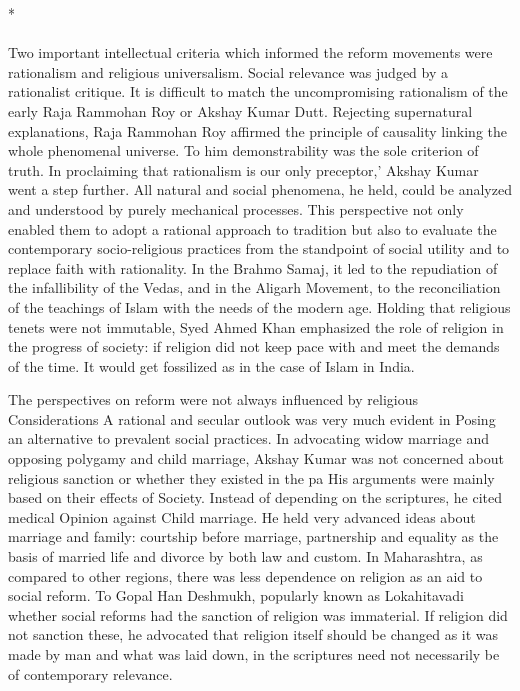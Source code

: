 \begin{center}*\end{center}

\paragraph*{}

Two important intellectual criteria which informed the reform movements were rationalism and religious universalism. Social relevance was judged by a rationalist critique. It is difficult to match the uncompromising rationalism of the early Raja Rammohan Roy or Akshay Kumar Dutt. Rejecting supernatural explanations, Raja Rammohan Roy affirmed the principle of causality linking the whole phenomenal universe. To him demonstrability was the sole criterion of truth. In proclaiming that rationalism is our only preceptor,' Akshay Kumar went a step further. All natural and social phenomena, he held, could be analyzed and understood by purely mechanical processes. This perspective not only enabled them to adopt a rational approach to tradition but also to evaluate the contemporary socio-religious practices from the standpoint of social utility and to replace faith with rationality. In the Brahmo Samaj, it led to the repudiation of the infallibility of the Vedas, and in the Aligarh Movement, to the reconciliation of the teachings of Islam with the needs of the modern age. Holding that religious tenets were not immutable, Syed Ahmed Khan emphasized the role of religion in the progress of society: if religion did not keep pace with and meet the demands of the time. It would get fossilized as in the case of Islam in India.

The perspectives on reform were not always influenced by religious Considerations A rational and secular outlook was very much evident in Posing an alternative to prevalent social practices. In advocating widow marriage and opposing polygamy and child marriage, Akshay Kumar was not concerned about religious sanction or whether they existed in the pa His arguments were mainly based on their effects of Society. Instead of depending on the scriptures, he cited medical Opinion against Child marriage. He held very advanced ideas about marriage and family: courtship before marriage, partnership and equality as the basis of married life and divorce by both law and custom. In Maharashtra, as compared to other regions, there was less dependence on religion as an aid to social reform. To Gopal Han Deshmukh, popularly known as Lokahitavadi whether social reforms had the sanction of religion was immaterial. If religion did not sanction these, he advocated that religion itself should be changed as it was made by man and what was laid down, in the scriptures need not necessarily be of contemporary relevance.

